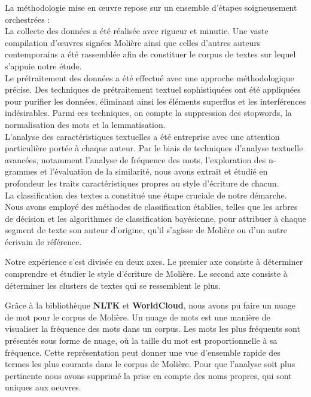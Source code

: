 \vspace{\baselineskip}
\hspace{0,5cm}La méthodologie mise en œuvre repose sur un ensemble d'étapes
soigneusement orchestrées : \\La collecte des données a été réalisée avec
rigueur et minutie. Une vaste compilation d'œuvres signées Molière ainsi que
celles d'autres auteurs contemporains a été rassemblée afin de constituer le
corpus de textes sur lequel s'appuie notre étude.  \\Le prétraitement des
données a été effectué avec une approche méthodologique précise. Des techniques
de prétraitement textuel sophistiquées ont été appliquées pour purifier les
données, éliminant ainsi les éléments superflus et les interférences
indésirables. Parmi ces techniques, on compte la suppression des stopwords, la
normalisation des mots et la lemmatisation.  \\L'analyse des caractéristiques
textuelles a été entreprise avec une attention particulière portée à chaque
auteur. Par le biais de techniques d'analyse textuelle avancées, notamment
l'analyse de fréquence des mots, l'exploration des n-grammes et l'évaluation de
la similarité, nous avons extrait et étudié en profondeur les traits
caractéristiques propres au style d'écriture de chacun.  \\La classification des
textes a constitué une étape cruciale de notre démarche.  Nous avons employé des
méthodes de classification établies, telles que les arbres de décision et les
algorithmes de classification bayésienne, pour attribuer à chaque segment de
texte son auteur d'origine, qu'il s'agisse de Molière ou d'un autre écrivain de
référence. 

\hspace{0,5cm}Notre expérience s'est divisée en deux axes. Le premier axe
consiste à déterminer comprendre et étudier le style d'écriture de Molière. Le
second axe consiste à déterminer les clusters de textes qui se ressemblent le
plus.

\hspace{0,5cm}Grâce à la bibliothèque \textbf{NLTK} et \textbf{WorldCloud}, nous
avons pu faire un nuage de mot pour le corpus de Molière. Un nuage de mots est
une manière de visualiser la fréquence des mots dans un corpus. Les mots
les plus fréquents sont présentés sous forme de nuage, où la taille du mot est
proportionnelle à sa fréquence. Cette représentation peut donner une vue
d'ensemble rapide des termes les plus courants dans le corpus de Molière. Pour
que l'analyse soit plus pertinente nous avons supprimé la prise en compte des
noms propres, qui sont uniques aux oeuvres.


